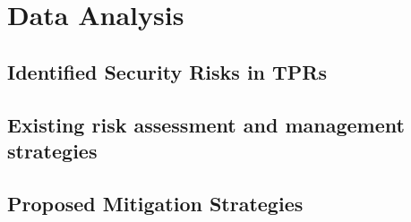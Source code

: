 
\newpage
\section{Data Analysis}

\subsection{Identified Security Risks in TPRs}


\subsection{Existing risk assessment and management strategies}


\subsection{Proposed Mitigation Strategies}

